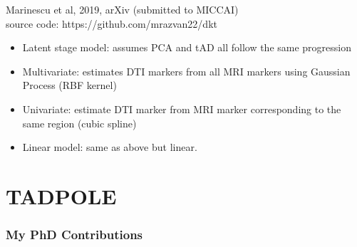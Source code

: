\documentclass[8pt,xcolor=table]{beamer}
\begin{document}
\begin{frame}[label=current]
\begin{table}
Marinescu et al, 2019, arXiv (submitted to MICCAI)\\
source code: https://github.com/mrazvan22/dkt
\label{sec:dktPerfMetrics}
\end{table}


\vspace{2em}



\begin{small}
\begin{itemize}
\item Latent stage model: assumes PCA and tAD all follow the same progression
\item Multivariate: estimates DTI markers from all MRI markers using Gaussian Process (RBF kernel)
\item Univariate: estimate DTI marker from MRI marker corresponding to the same region (cubic spline)
\item Linear model: same as above but linear.
\end{itemize}
\end{small}

\end{frame}


\section{TADPOLE}

\begin{frame}
\frametitle{My PhD Contributions}


\begin{figure}
\centering


{ 
\ovEBM 
\ovVWDPM

\ovDKT}
\ovTadpole

{ 
\ovPainter}

\end{figure}

\end{frame}
\end{document}
